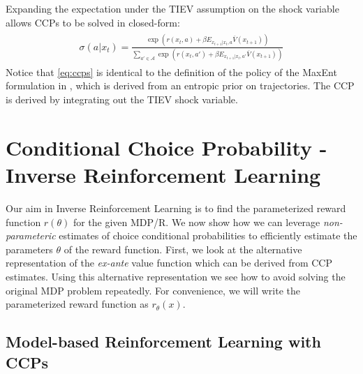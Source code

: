 \documentclass{article}
\begin{document}
Expanding the expectation under the TIEV assumption on the shock variable allows CCPs to be solved in closed-form:
\begin{align} \label{eq:ccps}
\begin{split}
\sigma(a|x_t)=\frac{\exp\left(r(x_t,a)+\beta E_{x_{t+1}|x_t,a} \overline{V}(x_{t+1})\right)}{\sum_{a'\in\mathcal{A}} \exp\left(r(x_t,a')+\beta E_{x_{t+1}|x_t,a'} \overline{V}(x_{t+1})\right)}
\end{split}
\end{align}
Notice that \eqref{eq:ccps} is identical to the definition of the policy of the MaxEnt formulation in \cite{ziebart_phd}, which is derived from an entropic prior on trajectories. The CCP is derived by integrating out the TIEV shock variable. 





\section{Conditional Choice Probability - Inverse Reinforcement Learning}

Our aim in Inverse Reinforcement Learning is to find the parameterized reward function $r(\theta)$ for the given MDP/R. We now show how we can leverage \textit{non-parameteric} estimates of choice conditional probabilities to efficiently estimate the parameters $\theta$ of the reward function.  
First, we look at the alternative representation of the \emph{ex-ante} value function which can be derived from CCP estimates. Using this alternative representation we see how to avoid solving the original MDP problem repeatedly.
For convenience, we will write the parameterized reward function as $r_{\theta}(x)$.

\subsection{Model-based Reinforcement Learning with CCPs}
\end{document}
